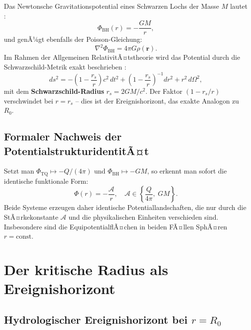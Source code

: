 ﻿\documentclass[12pt,a4paper]{report}
\begin{document}
Das Newtonsche Gravitationspotential eines Schwarzen Lochs der Masse $M$ lautet \cite{misner1973}:
\begin{equation}
	\Phi_{\mathrm{BH}}(r) = -\frac{GM}{r},
	\label{eq:potential_bh}
\end{equation}
und genÃ¼gt ebenfalls der Poisson-Gleichung:
\begin{equation}
	\nabla^2 \Phi_{\mathrm{BH}} = 4\pi G\rho(\mathbf{r}).
	\label{eq:poisson_bh}
\end{equation}
Im Rahmen der Allgemeinen RelativitÃ¤tstheorie wird das Potential durch die Schwarzschild-Metrik exakt beschrieben \cite{schwarzschild1916}:
\begin{equation}
	ds^2 = -\left(1 - \frac{r_s}{r}\right)c^2\,dt^2 + \left(1-\frac{r_s}{r}\right)^{-1}dr^2 + r^2\,d\Omega^2,
	\label{eq:schwarzschild_metrik}
\end{equation}
mit dem \textbf{Schwarzschild-Radius} $r_s = 2GM/c^2$. Der Faktor $(1 - r_s/r)$ verschwindet bei $r = r_s$ -- dies ist der Ereignishorizont, das exakte Analogon zu $R_0$.

\subsection{Formaler Nachweis der PotentialstrukturidentitÃ¤t}

Setzt man $\Phi_{\mathrm{TQ}} \mapsto -Q/(4\pi)$ und $\Phi_{\mathrm{BH}} \mapsto -GM$, so erkennt man sofort die identische funktionale Form:
\begin{equation}
	\boxed{\Phi(r) = -\frac{\mathcal{A}}{r}, \quad \mathcal{A} \in \left\{\frac{Q}{4\pi},\; GM\right\}.}
	\label{eq:potential_identitaet}
\end{equation}
Beide Systeme erzeugen daher identische Potentiallandschaften, die nur durch die StÃ¤rke\-konstante $\mathcal{A}$ und die physikalischen Einheiten verschieden sind. Insbesondere sind die EquipotentialflÃ¤chen in beiden FÃ¤llen SphÃ¤ren $r = \mathrm{const}$.

\section{Der kritische Radius als Ereignishorizont}

\subsection{Hydrologischer Ereignishorizont bei $r = R_0$}
\end{document}
